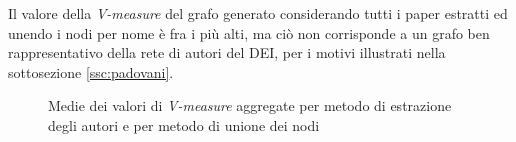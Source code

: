\documentclass[12pt,a4paper,twoside]{report}
\begin{document}
Il valore della \textit{V-measure} del grafo generato considerando tutti i paper estratti ed unendo
i nodi per nome è fra i più alti, ma ciò non corrisponde a un grafo ben rappresentativo della rete
di autori del DEI, per i motivi illustrati nella sottosezione \ref{ssc:padovani}.

\begin{figure}[H]
    \begin{minipage}[c]{0.60\textwidth}
    \setlength{\fboxrule}{0pt}	%
    \end{minipage}
    \begin{minipage}[c]{0.32\textwidth}
    \caption{Medie dei valori di \textit{V-measure} aggregate per metodo di estrazione degli autori
        e per metodo di unione dei nodi}
    \label{img:vmeasureestrazione}
    \end{minipage}
\end{figure}


\end{document}

